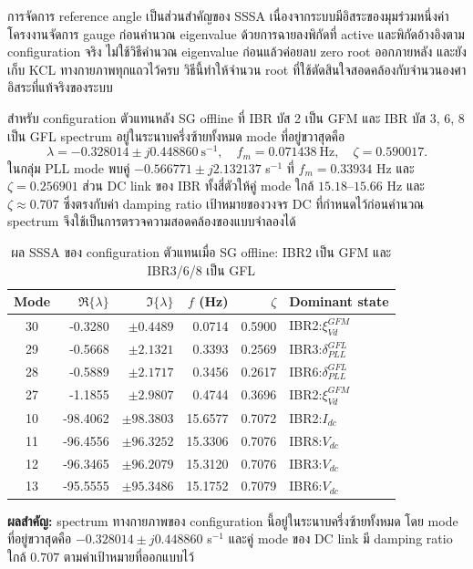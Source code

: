 \documentclass[12pt,a4paper]{article}
\newcommand{\tableheader}{\rowcolor{tablehead}}
\newcommand{\resultbox}[1]{\par\noindent\colorbox{academicgray}{\parbox{\dimexpr\textwidth-2\fboxsep\relax}{\textbf{ผลสำคัญ:} #1}}\par}
\begin{document}
การจัดการ reference angle เป็นส่วนสำคัญของ SSSA เนื่องจากระบบมีอิสระของมุมร่วมหนึ่งค่า โครงงานจัดการ gauge ก่อนคำนวณ eigenvalue ด้วยการฉายลงพิกัดที่ active และพิกัดอ้างอิงตาม configuration จริง ไม่ใช้วิธีคำนวณ eigenvalue ก่อนแล้วค่อยลบ zero root ออกภายหลัง และยังเก็บ KCL ทางกายภาพทุกแถวไว้ครบ วิธีนี้ทำให้จำนวน root ที่ใช้ตัดสินใจสอดคล้องกับจำนวนองศาอิสระที่แท้จริงของระบบ

สำหรับ configuration ตัวแทนหลัง SG offline ที่ IBR บัส 2 เป็น GFM และ IBR บัส 3, 6, 8 เป็น GFL spectrum อยู่ในระนาบครึ่งซ้ายทั้งหมด mode ที่อยู่ขวาสุดคือ
\begin{equation}
\lambda=-0.328014\pm j0.448860\ \mathrm{s}^{-1},
\quad f_m=0.071438\ \mathrm{Hz},\quad \zeta=0.590017.
\end{equation}
ในกลุ่ม PLL mode พบคู่ $-0.566771\pm j2.132137$ s$^{-1}$ ที่ $f_m=0.33934$ Hz และ $\zeta=0.256901$ ส่วน DC link ของ IBR ทั้งสี่ตัวให้คู่ mode ใกล้ $15.18$--$15.66$ Hz และ $\zeta\approx0.707$ ซึ่งตรงกับค่า damping ratio เป้าหมายของวงจร DC ที่กำหนดไว้ก่อนคำนวณ spectrum จึงใช้เป็นการตรวจความสอดคล้องของแบบจำลองได้

\begin{table}[H]
\centering
\caption{ผล SSSA ของ configuration ตัวแทนเมื่อ SG offline: IBR2 เป็น GFM และ IBR3/6/8 เป็น GFL}
\label{tab:sssa_modes}
\begin{tabularx}{0.99\textwidth}{@{}c r r r r X@{}}
\toprule
\tableheader Mode & $\Re\{\lambda\}$ & $\Im\{\lambda\}$ & $f$ (Hz) & $\zeta$ & Dominant state \\
\midrule
30 & -0.3280 & $\pm0.4489$ & 0.0714 & 0.5900 & IBR2:$\xi_{Vd}^{GFM}$ \\
29 & -0.5668 & $\pm2.1321$ & 0.3393 & 0.2569 & IBR3:$\delta_{PLL}^{GFL}$ \\
28 & -0.5889 & $\pm2.1717$ & 0.3456 & 0.2617 & IBR6:$\delta_{PLL}^{GFL}$ \\
27 & -1.1855 & $\pm2.9807$ & 0.4744 & 0.3696 & IBR2:$\xi_{Vd}^{GFM}$ \\
10 & -98.4062 & $\pm98.3803$ & 15.6577 & 0.7072 & IBR2:$I_{dc}$ \\
11 & -96.4556 & $\pm96.3252$ & 15.3306 & 0.7076 & IBR8:$V_{dc}$ \\
12 & -96.3465 & $\pm96.2079$ & 15.3120 & 0.7076 & IBR3:$V_{dc}$ \\
13 & -95.5555 & $\pm95.3486$ & 15.1752 & 0.7079 & IBR6:$V_{dc}$ \\
\bottomrule
\end{tabularx}
\end{table}
\resultbox{spectrum ทางกายภาพของ configuration นี้อยู่ในระนาบครึ่งซ้ายทั้งหมด โดย mode ที่อยู่ขวาสุดคือ $-0.328014\pm j0.448860$ s$^{-1}$ และคู่ mode ของ DC link มี damping ratio ใกล้ $0.707$ ตามค่าเป้าหมายที่ออกแบบไว้}
\end{document}
